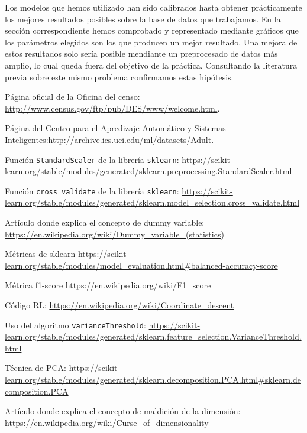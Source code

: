 \documentclass[11pt,a4paper]{article}
\begin{document}
Los modelos que hemos utilizado han sido calibrados hasta obtener prácticamente los mejores resultados posibles sobre la base de datos que trabajamos. En la sección correspondiente hemos comprobado y representado mediante gráficos que los parámetros elegidos son los que producen un mejor resultado. Una mejora de estos resultados solo sería posible mendiante un preprocesado de datos más amplio, lo cual queda fuera del objetivo de la práctica. Consultando la literatura\cite{statistical} previa sobre este mismo problema confirmamos estas hipótesis.   


\newpage
\begin{thebibliography}{9}
Página oficial de la Oficina del censo: \url{http://www.census.gov/ftp/pub/DES/www/welcome.html}.

Página del Centro para el Apredizaje Automático y Sistemas Inteligentes:\url{http://archive.ics.uci.edu/ml/datasets/Adult}.

Función \texttt{StandardScaler} de la librería \texttt{sklearn}: \url{https://scikit-learn.org/stable/modules/generated/sklearn.preprocessing.StandardScaler.html}

Función \texttt{cross\_validate} de la librería \texttt{sklearn}:
\url{https://scikit-learn.org/stable/modules/generated/sklearn.model_selection.cross_validate.html}

Artículo donde explica el concepto de dummy variable: \url{https://en.wikipedia.org/wiki/Dummy_variable_(statistics)}

Métricas de sklearn \url{https://scikit-learn.org/stable/modules/model_evaluation.html#balanced-accuracy-score}


Métrica f1-score \url{https://en.wikipedia.org/wiki/F1_score}


Código RL: \url{https://en.wikipedia.org/wiki/Coordinate_descent}


Uso del algoritmo \texttt{varianceThreshold}: \url{https://scikit-learn.org/stable/modules/generated/sklearn.feature_selection.VarianceThreshold.html}

Técnica de PCA: 
\url{https://scikit-learn.org/stable/modules/generated/sklearn.decomposition.PCA.html#sklearn.decomposition.PCA}

Artículo donde explica el concepto de maldición de la dimensión: \url{https://en.wikipedia.org/wiki/Curse_of_dimensionality}


\end{thebibliography}
\end{document}
